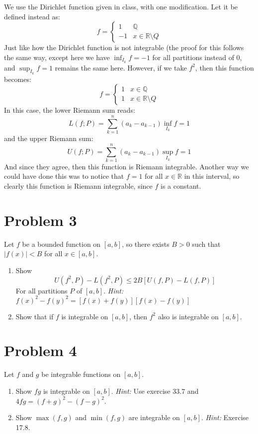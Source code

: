 \documentclass[10pt]{article}
\begin{document}
	\begin{solution}
		We use the Dirichlet function given in class, with one modification. Let it be defined instead as: 
		\[
		f = \begin{cases}
			1 & \mathbb Q\\
			-1 & x \in \mathbb R \setminus Q
		\end{cases}
		\] 
		Just like how the Dirichlet function is not integrable (the proof for this follows the same way, except
		here we have $\inf_{I_k} f = -1$ for all partitions instead of 0, and $\sup_{I_k} f = 1$ remains
		the same here. However, if we take $f^2$, then this function becomes:
		\[
		f = \begin{cases}
			1 & x \in \mathbb Q\\
			1 & x \in \mathbb R \setminus Q 
		\end{cases}
		\] 
		In this case, the lower Riemann sum reads:
		\[
			L(f; P) = \sum_{k = 1}^n (a_k - a_{k-1}) \inf_{I_k} f = 1
		\] 
		and the upper Riemann sum: 
		\[
			U(f; P) = \sum_{k = 1}^{n} (a_k - a_{k-1}) \sup_{I_k} f = 1
		\] 
		And since they agree, then this function is Riemann integrable. Another way we could have done this was 
		to notice that $f = 1$ for all $x \in \mathbb R$ in this interval, so clearly this function is Riemann
		integrable, since $f$ is a constant. 
	\end{solution}


	\pagebreak
	\section{Problem 3}
	Let $f$ be a bounded function on $[a, b]$, so there exists $B > 0$ such that $|f(x)| < B$ for all $x \in 
	[a, b]$.
	\begin{enumerate}[label=\alph*)]
		\item Show 
			\[
				U(f^2, P) - L(f^2, P) \le 2B[U(f, P) - L(f, P)]
			\] 
			For all partitions $P$ of $[a, b]$. \textit{Hint:} $f(x)^2 - f(y)^2 = [f(x) + f(y)][f(x) - f(y)]$

			\begin{solution}

			\end{solution}
		\item Show that if $f$ is integrable on $[a, b]$, then $f^2$ also is integrable on $[a, b]$. 
	\end{enumerate}




	\pagebreak
	\section*{Problem 4}
	Let $f$ and $g$ be integrable functions on $[a, b]$.
	\begin{enumerate}[label=\alph*)]
		\item Show $fg$ is integrable on $[a, b]$. \textit{Hint:} Use exercise 33.7 and $4fg = (f+g)^2 -
			(f-g)^2$.
		\item Show $\max(f, g)$ and $\min(f, g)$ are integrable on $[a, b]$. \textit{Hint:} Exercise 17.8.
	\end{enumerate}
\end{document}
